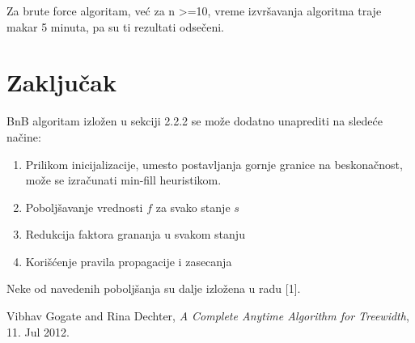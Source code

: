\documentclass[10pt]{article}
\begin{document}
Za brute force algoritam, već za n >=10, vreme izvršavanja algoritma traje makar 5 minuta, pa su ti rezultati odsečeni.

\section{Zaključak}
BnB algoritam izložen u sekciji 2.2.2 se može dodatno unaprediti na sledeće načine:
\begin{enumerate}
    \item Prilikom inicijalizacije, umesto postavljanja gornje granice na beskonačnost, može se izračunati min-fill heuristikom.
    \item Poboljšavanje vrednosti $f$ za svako stanje $s$
    \item Redukcija faktora grananja u svakom stanju
    \item Korišćenje pravila propagacije i zasecanja
\end{enumerate}
Neke od navedenih poboljšanja su dalje izložena u radu [1].


\begin{thebibliography}{99} %

 Vibhav Gogate and Rina Dechter, \emph{A Complete Anytime Algorithm for Treewidth}, 11. Jul 2012.




\end{thebibliography}

\end{document}
